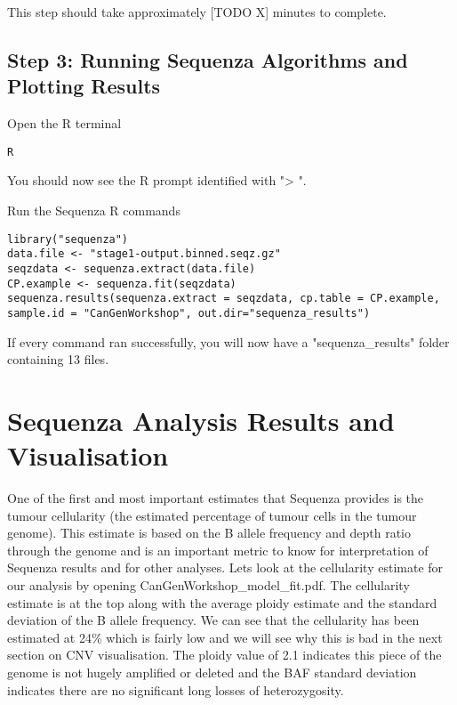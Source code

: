 This step should take approximately [TODO X] minutes to complete.


\subsection{Step 3: Running Sequenza Algorithms and Plotting Results}

\begin{steps}
Open the R terminal
\begin{lstlisting}
R
\end{lstlisting}
\end{steps}

You should now see the R prompt identified with "> ".

\begin{steps}
Run the Sequenza R commands
\begin{lstlisting}
library("sequenza")
data.file <- "stage1-output.binned.seqz.gz"
seqzdata <- sequenza.extract(data.file)
CP.example <- sequenza.fit(seqzdata)
sequenza.results(sequenza.extract = seqzdata, cp.table = CP.example, sample.id = "CanGenWorkshop", out.dir="sequenza_results")
\end{lstlisting}
\end{steps}

If every command ran successfully, you will now have a "sequenza\_results" folder containing 13 files.


\newpage


\section{Sequenza Analysis Results and Visualisation}

One of the first and most important estimates that Sequenza provides is the tumour cellularity (the estimated percentage of tumour cells in the tumour genome). This estimate is based on the B allele frequency and depth ratio through the genome and is an important metric to know for interpretation of Sequenza results and for other analyses. Lets look at the cellularity estimate for our analysis by opening CanGenWorkshop\_model\_fit.pdf. The cellularity estimate is at the top along with the average ploidy estimate and the standard deviation of the B allele frequency. We can see that the cellularity has been estimated at 24\% which is fairly low and we will see why this is bad in the next section on CNV visualisation. The ploidy value of 2.1 indicates this piece of the genome is not hugely amplified or deleted and the BAF standard deviation indicates there are no significant long losses of heterozygosity.

